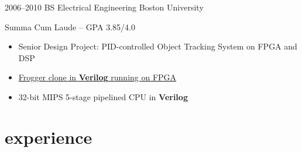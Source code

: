 \documentclass[print]{friggeri-cv} %
\begin{document}
\begin{entrylist}

\entry
{2006--2010}
{BS {\normalfont Electrical Engineering}}
{Boston University}
{Summa Cum Laude -- GPA 3.85/4.0
  \begin{itemize}
  \item Senior Design Project: PID-controlled Object Tracking System on FPGA and DSP
  \item \href{https://www.youtube.com/watch?v=S2LgUL5JLqQ}{Frogger clone in \textbf{Verilog} running on FPGA}
  \item 32-bit MIPS 5-stage pipelined CPU in \textbf{Verilog}
  \end{itemize}
}


\end{entrylist}


\section{experience}

\end{document}
